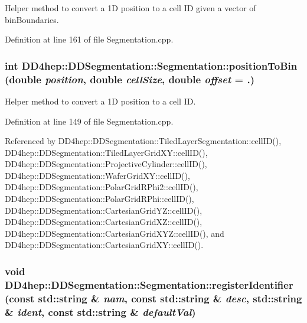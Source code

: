 Helper method to convert a 1D position to a cell ID given a vector of binBoundaries. 

Definition at line 161 of file Segmentation.cpp.\hypertarget{class_d_d4hep_1_1_d_d_segmentation_1_1_segmentation_ac4b0fad36827310fd144843d77e39d71}{
\subsubsection[{positionToBin}]{\setlength{\rightskip}{0pt plus 5cm}int DD4hep::DDSegmentation::Segmentation::positionToBin (double {\em position}, \/  double {\em cellSize}, \/  double {\em offset} = {.})}}
\label{class_d_d4hep_1_1_d_d_segmentation_1_1_segmentation_ac4b0fad36827310fd144843d77e39d71}


Helper method to convert a 1D position to a cell ID. 

Definition at line 149 of file Segmentation.cpp.

Referenced by DD4hep::DDSegmentation::TiledLayerSegmentation::cellID(), DD4hep::DDSegmentation::TiledLayerGridXY::cellID(), DD4hep::DDSegmentation::ProjectiveCylinder::cellID(), DD4hep::DDSegmentation::WaferGridXY::cellID(), DD4hep::DDSegmentation::PolarGridRPhi2::cellID(), DD4hep::DDSegmentation::PolarGridRPhi::cellID(), DD4hep::DDSegmentation::CartesianGridYZ::cellID(), DD4hep::DDSegmentation::CartesianGridXZ::cellID(), DD4hep::DDSegmentation::CartesianGridXYZ::cellID(), and DD4hep::DDSegmentation::CartesianGridXY::cellID().\hypertarget{class_d_d4hep_1_1_d_d_segmentation_1_1_segmentation_ab513ba2af3efb21c7ca2e17c6829aeca}{
\subsubsection[{registerIdentifier}]{\setlength{\rightskip}{0pt plus 5cm}void DD4hep::DDSegmentation::Segmentation::registerIdentifier (const std::string \& {\em nam}, \/  const std::string \& {\em desc}, \/  std::string \& {\em ident}, \/  const std::string \& {\em defaultVal})}}
\label{class_d_d4hep_1_1_d_d_segmentation_1_1_segmentation_ab513ba2af3efb21c7ca2e17c6829aeca}


